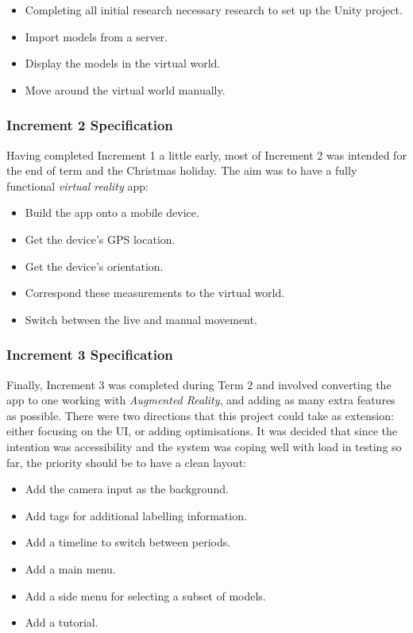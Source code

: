 \documentclass[12pt, a4paper]{article}
\begin{document}
\begin{itemize}
    \item Completing all initial research necessary research to set up the Unity project.
    \item Import models from a server.
    \item Display the models in the virtual world.
    \item Move around the virtual world manually. 
\end{itemize} 

\subsubsection{Increment 2 Specification}
Having completed Increment 1 a little early, most of Increment 2 was intended for the end of term and the Christmas holiday. The aim was to have a fully functional \textit{virtual reality} app: 
\begin{itemize}
    \item Build the app onto a mobile device.
    \item Get the device's GPS location.
    \item Get the device's orientation. 
    \item Correspond these measurements to the virtual world.
    \item Switch between the live and manual movement.
\end{itemize} 

\subsubsection{Increment 3 Specification}
\label{increment3}
Finally, Increment 3 was completed during Term 2 and involved converting the app to one working with \textit{Augmented Reality}, and adding as many extra features as possible. There were two directions that this project could take as extension: either focusing on the UI, or adding optimisations. It was decided that since the intention was accessibility and the system was coping well with load in testing so far, the priority should be to have a clean layout:
\begin{itemize}
    \item Add the camera input as the background.
    \item Add tags for additional labelling information.
    \item Add a timeline to switch between periods. 
    \item Add a main menu.
    \item Add a side menu for selecting a subset of models.
    \item Add a tutorial.
\end{itemize} 
\end{document}

